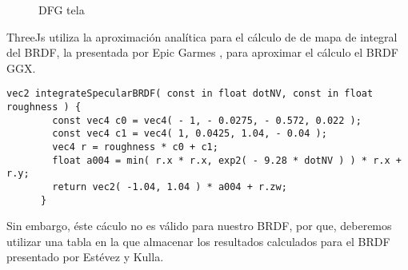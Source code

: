       \begin{figure}[H]
        \vspace{0.5cm}
        \centering
        \caption{DFG tela}
      \end{figure}

      ThreeJs utiliza la aproximaci\'on anal\'itica para el c\'alculo de de mapa de integral del BRDF,
      la presentada por Epic Garmes \autocite{shadingmobile}, para aproximar el c\'alculo el BRDF GGX.\\

      \begin{lstlisting}[caption=Apromixaci\'on anal\'itica a la integral del BRDF en ThreeJs]
      vec2 integrateSpecularBRDF( const in float dotNV, const in float roughness ) {
        const vec4 c0 = vec4( - 1, - 0.0275, - 0.572, 0.022 );
        const vec4 c1 = vec4( 1, 0.0425, 1.04, - 0.04 );
        vec4 r = roughness * c0 + c1;
        float a004 = min( r.x * r.x, exp2( - 9.28 * dotNV ) ) * r.x + r.y;
        return vec2( -1.04, 1.04 ) * a004 + r.zw;
      }
      \end{lstlisting}
      \singlespacing

      Sin embargo, \'este c\'aculo no es v\'alido para nuestro BRDF, por que, deberemos utilizar una
      tabla en la que almacenar los resultados calculados para el BRDF presentado por Est\'evez y Kulla.
    \egroup
